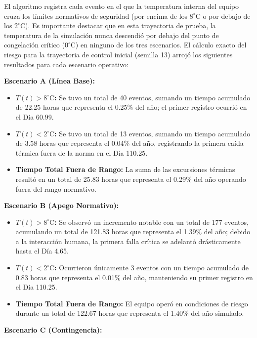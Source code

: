 \documentclass[
  spanish,
  letterpaper,
  DIV=11,
  numbers=noendperiod]{scrreprt}
\providecommand{\tightlist}{%
  \setlength{\itemsep}{0pt}\setlength{\parskip}{0pt}}
\theoremstyle{plain}
\theoremstyle{plain}
\theoremstyle{plain}
\theoremstyle{definition}
\theoremstyle{remark}
\begin{document}
El algoritmo registra cada evento en el que la temperatura interna del
equipo cruza los límites normativos de seguridad (por encima de los
\(8^\circ\text{C}\) o por debajo de los \(2^\circ\text{C}\)). Es
importante destacar que en esta trayectoria de prueba, la temperatura de
la simulación nunca descendió por debajo del punto de congelación
crítico (\(0^\circ\text{C}\)) en ninguno de los tres escenarios. El
cálculo exacto del riesgo para la trayectoria de control inicial
(semilla 13) arrojó los siguientes resultados para cada escenario
operativo:

\textbf{Escenario A (Línea Base):}

\begin{itemize}
\tightlist
\item
  \textbf{\(T(t)>8^\circ\text{C}\):} Se tuvo un total de 40 eventos,
  sumando un tiempo acumulado de 22.25 horas que representa el 0.25\%
  del año; el primer registro ocurrió en el Día 60.99.
\item
  \textbf{\(T(t)<2^\circ\text{C}\):} Se tuvo un total de 13 eventos,
  sumando un tiempo acumulado de 3.58 horas que representa el 0.04\% del
  año, registrando la primera caída térmica fuera de la norma en el Día
  110.25.
\item
  \textbf{Tiempo Total Fuera de Rango:} La suma de las excursiones
  térmicas resultó en un total de 25.83 horas que representa el 0.29\%
  del año operando fuera del rango normativo.
\end{itemize}

\textbf{Escenario B (Apego Normativo):}

\begin{itemize}
\tightlist
\item
  \textbf{\(T(t)>8^\circ\text{C}\):} Se observó un incremento notable
  con un total de 177 eventos, acumulando un total de 121.83 horas que
  representa el 1.39\% del año; debido a la interacción humana, la
  primera falla crítica se adelantó drásticamente hasta el Día 4.65.
\item
  \textbf{\(T(t)<2^\circ\text{C}\):} Ocurrieron únicamente 3 eventos con
  un tiempo acumulado de 0.83 horas que representa el 0.01\% del año,
  manteniendo su primer registro en el Día 110.25.
\item
  \textbf{Tiempo Total Fuera de Rango:} El equipo operó en condiciones
  de riesgo durante un total de 122.67 horas que representa el 1.40\%
  del año simulado.
\end{itemize}

\textbf{Escenario C (Contingencia):}
\end{document}
